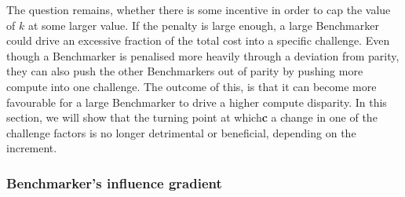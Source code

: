 The question remains, whether there is some incentive in order to cap the value of $k$ at some larger value. 
If the penalty is large enough, a large Benchmarker could drive an excessive fraction of the total cost into a specific challenge.
Even though a Benchmarker is penalised more heavily through a deviation from parity, they can also push the other Benchmarkers out of parity by pushing more compute into one challenge.
The outcome of this, is that it can become more favourable for a large Benchmarker to drive a higher compute disparity.
In this section, we will show that the turning point at which\textbf{c} a change in one of the challenge factors is no longer detrimental or beneficial, depending on the increment. 

\subsubsection{Benchmarker's influence gradient}

